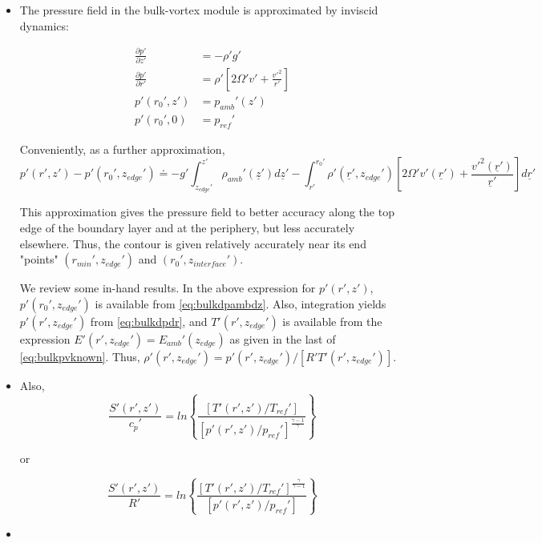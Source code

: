 \documentclass[preprint, prX]{revtex4}
\newcommand{\cbfrac}[2]{\left\{\frac{#1}{#2}\right\}}
\newcommand{\pd}[2]{\frac{\partial#1}{\partial#2}}
\newcommand{\gogmo}{\frac{\gamma}{\gamma-1}}
\newcommand{\rmin}{r_{min}}
\newcommand{\zedge}{z_{edge}}
\newcommand{\zinter}{z_{interface}}
\begin{document}
\begin{itemize}
\item The pressure field in the bulk-vortex module is approximated by inviscid dynamics:

\begin{equation}
\begin{split}
	\pd{ p'}{ z'} &= -\rho' g' \\
	\pd{ p'}{ r'} & = \rho'\left[ 2\Omega' v' + \frac{v'^2}{r'} \right ]\\
	p'(r_0',z') &= p_{amb}'(z') \\
	p'(r_0',0) &= p_{ref}'
\end{split}
\end{equation}

Conveniently, as a further approximation,
\begin{equation}
	p'(r',z') - p'(r_0', \zedge') \doteq -g' \int_{\zedge'}^{z'} \rho_{amb}'(\underline{z}') d\underline{z}' - \int_{r'}^{r_0'} \rho'(\underline{r}', \zedge') \left[ 2\Omega'v'(\underline{r}') + \frac{v'^2(\underline{r}')}{\underline{r}'}\right] d\underline{r}'
\end{equation}

This approximation gives the pressure field to better accuracy along the top edge of the boundary layer and at the periphery, but less accurately elsewhere. Thus, the contour is given relatively accurately near its end "points" $(\rmin', \zedge')$ and $(r_0', \zinter')$.

We review some in-hand results. In the above expression for $p'(r',z')$, $p'(r_0', \zedge')$ is available from \eqref{eq:bulkdpambdz}. Also, integration yields $p'(r',\zedge')$ from \eqref{eq:bulkdpdr}, and $T'(r',\zedge')$ is available from the expression $E'(r',\zedge') = E_{amb}'(\zedge)$ as given in the last of \eqref{eq:bulkpvknown}. Thus, $\rho'(r',\zedge') = p'(r',\zedge')/[R' T'(r',\zedge')]$.

\item Also, 
\begin{equation}
	\frac{S'(r',z')}{c_p'} = ln \cbfrac{ \left[ T'(r',z')/T_{ref}'\right] }{\left[ p'(r',z')/p_{ref}' \right]^\frac{\gamma-1}{\gamma} }
\end{equation}

or

\begin{equation}
	\frac{S'(r',z')}{R'} = ln \cbfrac{ \left[ T'(r',z')/T_{ref}'\right]^\gogmo }{\left[ p'(r',z')/p_{ref}' \right] }
\end{equation}

\item 


\end{itemize}
\end{document}
